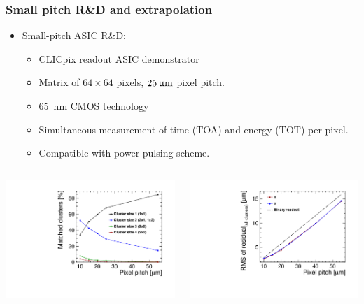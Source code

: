 \begin{frame}
  \frametitle{Small pitch R\&D and extrapolation}


  \begin{itemize}
  \item Small-pitch ASIC R\&D:
    \begin{itemize}
    \item CLICpix readout ASIC demonstrator
    \item Matrix of $64\times64$ pixels, $25\,\upmu\mathrm{m}$ pixel pitch.
    \item 65~nm CMOS technology
    \item Simultaneous measurement of time (TOA) and energy (TOT) per
      pixel.
    \item Compatible with power pulsing scheme.
    \end{itemize}
  \end{itemize}

  \begin{columns}
    \centering
    \includegraphics[width=\textwidth]{../figures/TestBeam/ClusterSize_extrapolationSmallerPixels.pdf}

    \centering
    \includegraphics[width=\textwidth]{../figures/TestBeam/RMS_extrapolationSmallerPixels.pdf}
  \end{columns}

\end{frame}

